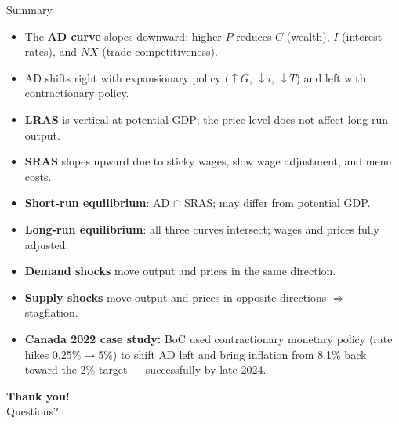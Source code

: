 \documentclass[aspectratio=169]{beamer}
\begin{document}
\begin{frame}{Summary}
\transfade
\begin{itemize}
  \item The \textbf{AD curve} slopes downward: higher $P$ reduces $C$ (wealth), $I$ (interest rates), and $NX$ (trade competitiveness).
  \item AD shifts right with expansionary policy ($\uparrow G$, $\downarrow i$, $\downarrow T$) and left with contractionary policy.
  \item \textbf{LRAS} is vertical at potential GDP; the price level does not affect long-run output.
  \item \textbf{SRAS} slopes upward due to sticky wages, slow wage adjustment, and menu costs.
  \item \textbf{Short-run equilibrium}: AD $\cap$ SRAS; may differ from potential GDP.
  \item \textbf{Long-run equilibrium}: all three curves intersect; wages and prices fully adjusted.
  \item \textbf{Demand shocks} move output and prices in the same direction.
  \item \textbf{Supply shocks} move output and prices in opposite directions $\Rightarrow$ stagflation.
  \item \textbf{Canada 2022 case study:} BoC used contractionary monetary policy (rate hikes 0.25\%$\to$5\%) to shift AD left and bring inflation from 8.1\% back toward the 2\% target --- successfully by late 2024.
\end{itemize}
\end{frame}

\begin{frame}
\centering
\Huge \textbf{Thank you!}\\[1em]
\large Questions?
\end{frame}
\end{document}
